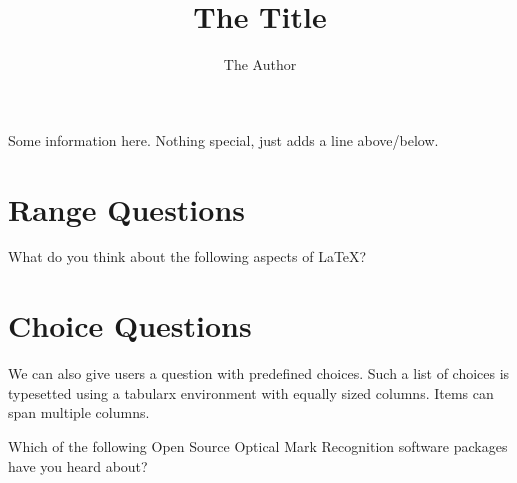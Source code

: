 \documentclass[
  english,
  pagemark,
  stamp]{sdapsclassic}
\author{The Author}
\title{The Title}
\begin{document}

  \begin{questionnaire}
    \begin{info}
      Some information here. Nothing special, just adds a line above/below.
    \end{info}


    \section{Range Questions}


    \begin{markgroup}{What do you think about the following aspects of \LaTeX?}
    \end{markgroup}

    \section{Choice Questions}
    We can also give users a question with predefined choices. Such a list
    of choices is typesetted using a tabularx environment with equally
    sized columns. Items can span multiple columns.

    \begin{choicequestion}[cols=3]{Which of the following Open Source
                                   Optical Mark Recognition software
                                   packages have you heard about?}


\end{choicequestion}
\end{questionnaire}
\end{document}
